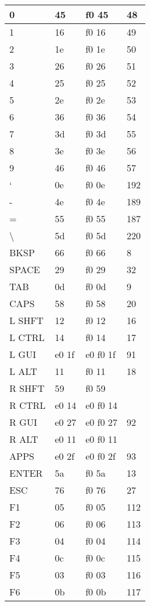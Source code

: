 \begin{longtable}{| p{} | p{} | p{} | p{} |}
  0 & 45 & f0 45 & 48 \\ \hline
  1 & 16 & f0 16 & 49 \\ \hline
  2 & 1e & f0 1e & 50 \\ \hline
  3 & 26 & f0 26 & 51 \\ \hline
  4 & 25 & f0 25 & 52 \\ \hline
  5 & 2e & f0 2e & 53 \\ \hline
  6 & 36 & f0 36 & 54 \\ \hline
  7 & 3d & f0 3d & 55 \\ \hline
  8 & 3e & f0 3e & 56 \\ \hline
  9 & 46 & f0 46 & 57 \\ \hline
  ‘ & 0e & f0 0e & 192 \\ \hline
  - & 4e & f0 4e & 189 \\ \hline
  = & 55 & f0 55 & 187 \\ \hline
  \textbackslash & 5d & f0 5d & 220 \\ \hline
  BKSP & 66 & f0 66 & 8 \\ \hline
  SPACE & 29 & f0 29 & 32 \\ \hline
  TAB & 0d & f0 0d & 9 \\ \hline
  CAPS & 58 & f0 58 & 20 \\ \hline
  L SHFT & 12 & f0 12 & 16 \\ \hline
  L CTRL & 14 & f0 14 & 17 \\ \hline
  L GUI & e0 1f & e0 f0 1f & 91 \\ \hline
  L ALT & 11 & f0 11 & 18 \\ \hline
  R SHFT & 59 & f0 59 &   \\ \hline
  R CTRL & e0 14 & e0 f0 14 &   \\ \hline
  R GUI & e0 27 & e0 f0 27 & 92 \\ \hline
  R ALT & e0 11 & e0 f0 11 &   \\ \hline
  APPS & e0 2f & e0 f0 2f & 93 \\ \hline
  ENTER & 5a & f0 5a & 13 \\ \hline
  ESC & 76 & f0 76 & 27 \\ \hline
  F1 & 05 & f0 05 & 112 \\ \hline
  F2 & 06 & f0 06 & 113 \\ \hline
  F3 & 04 & f0 04 & 114 \\ \hline
  F4 & 0c & f0 0c & 115 \\ \hline
  F5 & 03 & f0 03 & 116 \\ \hline
  F6 & 0b & f0 0b & 117 \\ \hline

\end{longtable}
